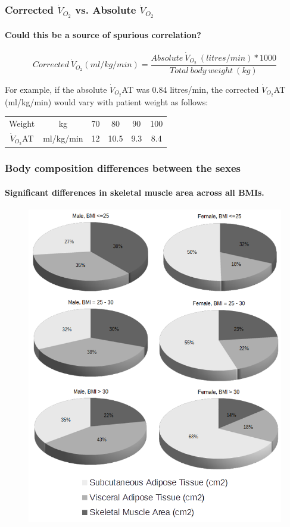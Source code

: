 \documentclass[10pt]{beamer}
\begin{document}
\begin{frame}
	\frametitle{Corrected $\dot{V}_{O_2}$ vs. Absolute $\dot{V}_{O_2}$}
	\framesubtitle{Could this be a source of spurious correlation?}
	
	\[Corrected\ \dot{V}_{O_2} (ml/kg/min) = \frac{Absolute\ \dot{V}_{O_2}\ (litres/min) * 1000}{Total\ body\ weight\ (kg)}\]

	\vfill
\pause	
	For example, if the absolute $\dot{V}_{O_2}$AT was 0.84 litres/min, the corrected $\dot{V}_{O_2}$AT (ml/kg/min) would vary with patient weight as follows:
	
	\begin{table}
	\begin{tabular}{c c c c c c}
		     Weight       & kg        & 70 & 80   & 90  & 100 \\
		$\dot{V}_{O_2}$AT & ml/kg/min & 12 & 10.5 & 9.3 & 8.4
	\end{tabular}
	\end{table}


\end{frame}

\begin{frame}
	\frametitle{Body composition differences between the sexes}
	\framesubtitle{Significant differences in skeletal muscle area across all BMIs.}
	\begin{figure}
		\centering
		\includegraphics[height=0.95\textheight]{../Figures/bc_gender_bmi_pie}
		\label{fig:bc_gimp}
	\end{figure}
\end{frame}
\end{document}
